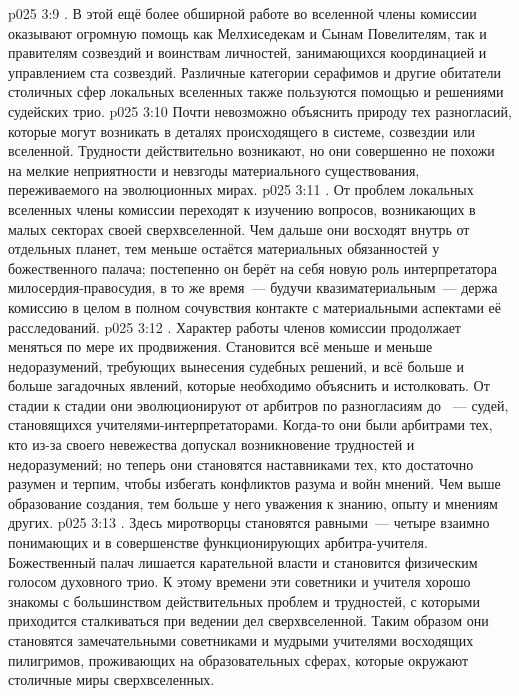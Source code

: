 \vs p025 3:9 . В этой ещё более обширной работе во вселенной члены комиссии оказывают огромную помощь как Мелхиседекам и Сынам Повелителям, так и правителям созвездий и воинствам личностей, занимающихся координацией и управлением ста созвездий. Различные категории серафимов и другие обитатели столичных сфер локальных вселенных также пользуются помощью и решениями судейских трио.
\vs p025 3:10 Почти невозможно объяснить природу тех разногласий, которые могут возникать в деталях происходящего в системе, созвездии или вселенной. Трудности действительно возникают, но они совершенно не похожи на мелкие неприятности и невзгоды материального существования, переживаемого на эволюционных мирах.
\vs p025 3:11 . От проблем локальных вселенных члены комиссии переходят к изучению вопросов, возникающих в малых секторах своей сверхвселенной. Чем дальше они восходят внутрь от отдельных планет, тем меньше остаётся материальных обязанностей у божественного палача; постепенно он берёт на себя новую роль интерпретатора милосердия\hyp{}правосудия, в то же время~--- будучи квазиматериальным~--- держа комиссию в целом в полном сочувствия контакте с материальными аспектами её расследований.
\vs p025 3:12 . Характер работы членов комиссии продолжает меняться по мере их продвижения. Становится всё меньше и меньше недоразумений, требующих вынесения судебных решений, и всё больше и больше загадочных явлений, которые необходимо объяснить и истолковать. От стадии к стадии они эволюционируют от арбитров по разногласиям до ~--- судей, становящихся учителями\hyp{}интерпретаторами. Когда\hyp{}то они были арбитрами тех, кто из\hyp{}за своего невежества допускал возникновение трудностей и недоразумений; но теперь они становятся наставниками тех, кто достаточно разумен и терпим, чтобы избегать конфликтов разума и войн мнений. Чем выше образование создания, тем больше у него уважения к знанию, опыту и мнениям других.
\vs p025 3:13 . Здесь миротворцы становятся равными~--- четыре взаимно понимающих и в совершенстве функционирующих арбитра\hyp{}учителя. Божественный палач лишается карательной власти и становится физическим голосом духовного трио. К этому времени эти советники и учителя хорошо знакомы с большинством действительных проблем и трудностей, с которыми приходится сталкиваться при ведении дел сверхвселенной. Таким образом они становятся замечательными советниками и мудрыми учителями восходящих пилигримов, проживающих на образовательных сферах, которые окружают столичные миры сверхвселенных.
